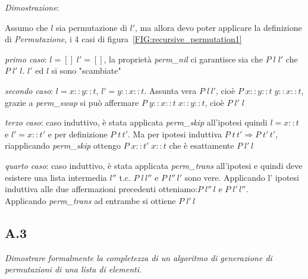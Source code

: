 \documentclass[a4paper]{article}
\newenvironment{dimostrazione}{\textit{Dimostrazione}:\begin{adjustwidth}{1cm}{}}{\end{adjustwidth}}
\begin{document}
\begin{dimostrazione}
	Assumo che $l$ sia permutazione di $l'$, ma allora devo poter applicare la definizione di \textit{Permutazione}, i 4 casi di figura~\ref{FIG:recursive_permutation1} 


	\textit{primo caso}: $l=[] \; l'=[]$, la proprietà \emph{perm\_nil} ci garantisce sia che $P \;l \; l'$ che $P \; l'\; l$. $l'$ ed $l$ si sono "scambiate"


	\textit{secondo caso}: $l = x::y::t$, $l'= y::x::t$. Assunta vera $P \; l \, l'$, cioè $P \; x::y::t \; y::x::t$, grazie a \emph{perm\_swap} si può affermare $P \; y::x::t \; x::y::t$, cioè $P \; l' \; l$

	\textit{terzo caso}: caso induttivo, è stata applicata \textit{perm\_skip} all'ipotesi quindi $l = x::t$ e $l' = x::t'$ e per definizione $P \; t \, t'$.
	Ma per ipotesi induttiva $P \; t \, t' \Rightarrow P \; t' \, t'$, riapplicando \textit{perm\_skip} ottengo $P \; x::t' \; x::t$ che è esattamente $P \; l' \, l$

	\textit{quarto caso}: caso induttivo, è stata applicata \textit{perm\_trans} all'ipotesi e quindi deve esistere una lista intermedia $l''$ t.c. $P\; l\, l''$ e $P \; l''\, l'$ sono vere.
	Applicando l' ipotesi induttiva alle due affermazioni precedenti otteniamo:$P\; l''\, l$ e $P \; l'\, l''$.\\
	Applicando \textit{perm\_trans} ad entrambe si ottiene $P \; l' \, l$
\end{dimostrazione}
\subsection{A.3}
\emph{Dimostrare formalmente la completezza di un algoritmo di generazione di permutazioni di una lista di elementi.}
\end{document}
